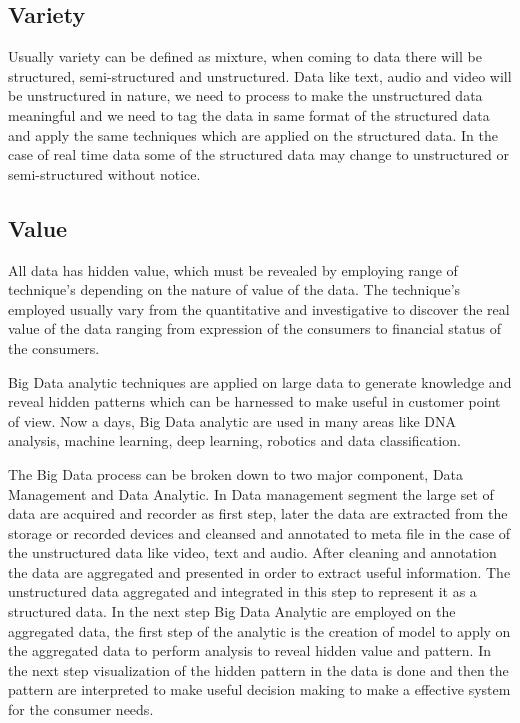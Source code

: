 \documentclass[sigconf]{acmart}
\begin{document}
\subsection{Variety}

Usually variety can be defined as mixture, when coming to data there will be structured, semi-structured and unstructured. Data like text, audio and video will be unstructured in nature, we need to process to make the unstructured data meaningful and we need to tag the data in same format of the structured data and apply the same techniques which are applied on the structured data. In the case of real time data some of the structured data may change to unstructured or semi-structured without notice.

\subsection{Value}

All data has hidden value, which must be revealed by employing range of technique's depending on the nature of value of the data. The technique's employed usually vary from the quantitative and investigative to discover the real value of the data ranging from expression of the consumers to financial status of the consumers.


Big Data analytic techniques are applied on large data to generate knowledge and reveal hidden patterns which can be harnessed to make useful in customer point of view. Now a days, Big Data analytic are used in many areas like DNA analysis, machine learning, deep learning, robotics and data classification.

The Big Data process can be broken down to two major component, Data Management and Data Analytic. In Data management segment the large set of data are acquired and recorder as first step, later the data are extracted from the storage or recorded devices and cleansed and annotated to meta file in the case of the unstructured data like video, text and audio. After cleaning and annotation the data are aggregated and presented in order to extract useful information. The unstructured data aggregated and integrated in this step to represent it as a structured data. In the next step Big Data Analytic are employed on the aggregated data, the first step of the analytic is the creation of model to apply on the aggregated data to perform analysis to reveal hidden value and pattern. In the next step visualization of the hidden pattern in the data is done and then the pattern are interpreted to make useful decision making to make a effective system for the consumer needs.
 
\end{document}
